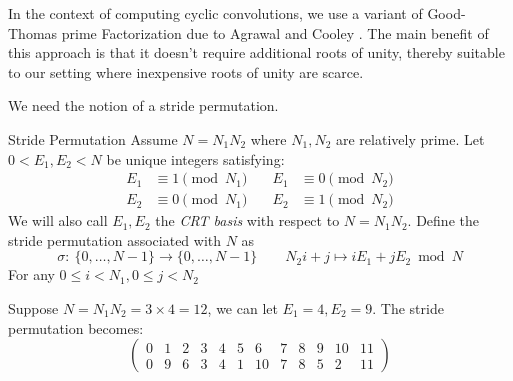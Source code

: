 In the context of computing cyclic convolutions, we use a variant of Good-Thomas prime Factorization due to Agrawal and Cooley \cite{IEEE:AgrCoo77}. The main benefit of this approach is that it doesn't require additional roots of unity, thereby suitable to our setting where inexpensive roots of unity are scarce.

We need the notion of a stride permutation.
\begin{definition}{Stride Permutation}\label{def:Stride}
    Assume \(N = N_1 N_2\) where \(N_1, N_2\) are relatively prime. Let \(0 < E_1, E_2 < N\) be unique integers satisfying:
    \begin{align*}
        E_1 &\equiv 1 \pmod{N_1} \quad &E_1 &\equiv 0 \pmod{N_2} \\
        E_2 &\equiv 0 \pmod{N_1} \quad &E_2 &\equiv 1 \pmod{N_2}
    \end{align*}
    We will also call \(E_1, E_2\) the \emph{CRT basis} with respect to \(N=N_1 N_2\). Define the stride permutation associated with \(N\) as
    \[\sigma:\: \{0,\ldots, N-1\} \to \{0, \ldots, N-1\} \qquad N_2 i + j \mapsto i E_1 + j E_2 \bmod N\]
    For any \(0 \le i < N_1, 0 \le j < N_2\)
\end{definition}

\ifFullVersion
\begin{example}
    Suppose \(N = N_1 N_2 = 3 \times 4 = 12\), we can let \(E_1 = 4, E_2 = 9\). The stride permutation becomes:
    \[\begin{pmatrix}
        0 & 1 & 2 & 3 & 4 & 5 & 6 & 7 & 8 & 9 & 10 & 11\\ 
        0 & 9 & 6 & 3 & 4 & 1 & 10 & 7 & 8 & 5 & 2 & 11
    \end{pmatrix}\]
\end{example}
\fi

